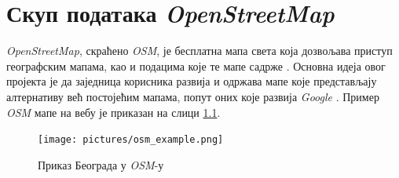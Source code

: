 \documentclass[12pt,oneside]{memoir}
\begin{document}
 %

\chapter{Скуп података \textit{OpenStreetMap}}
\label{chp:osm}

\textit{OpenStreetMap}, скраћено \textit{OSM}, је бесплатна мапа света која дозвољава приступ географским мапама, као и подацима које те мапе садрже \cite{osm_wiki}. Основна идеја овог пројекта је да заједница корисника развија и одржава мапе које представљају алтернативу већ постојећим мапама, попут оних које развија \textit{Google} \cite{google_maps}. Пример \textit{OSM} мапе на вебу је приказан на слици \ref{fig:osm_map_example}.

\begin{figure}[!ht]
  \centering
  \texttt{[image: pictures/osm\_example.png]}
  \caption{Приказ Београда у \textit{OSM}-у}
  \label{fig:osm_map_example}
\end{figure}
\end{document}
